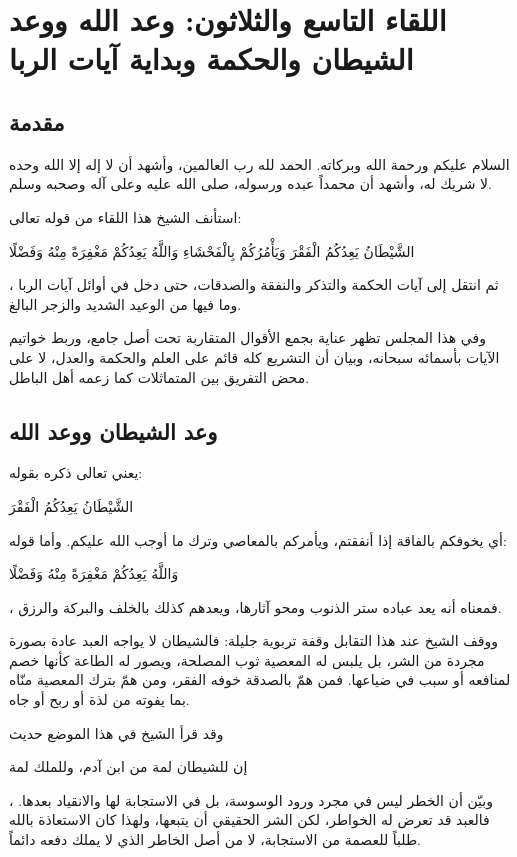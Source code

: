 \chapter{اللقاء التاسع والثلاثون: وعد الله ووعد الشيطان والحكمة وبداية آيات الربا}

\section{مقدمة}
السلام عليكم ورحمة الله وبركاته. الحمد لله رب العالمين، وأشهد أن لا إله إلا الله وحده لا شريك له، وأشهد أن محمداً عبده ورسوله، صلى الله عليه وعلى آله وصحبه وسلم.

استأنف الشيخ هذا اللقاء من قوله تعالى: \begin{ayah}الشَّيْطَانُ يَعِدُكُمُ الْفَقْرَ وَيَأْمُرُكُمْ بِالْفَحْشَاءِ وَاللَّهُ يَعِدُكُمْ مَغْفِرَةً مِنْهُ وَفَضْلًا\end{ayah}، ثم انتقل إلى آيات الحكمة والتذكر والنفقة والصدقات، حتى دخل في أوائل آيات الربا وما فيها من الوعيد الشديد والزجر البالغ.

وفي هذا المجلس تظهر عناية  بجمع الأقوال المتقاربة تحت أصل جامع، وربط خواتيم الآيات بأسمائه سبحانه، وبيان أن التشريع كله قائم على العلم والحكمة والعدل، لا على محض التفريق بين المتماثلات كما زعمه أهل الباطل.

\separator

\section{وعد الشيطان ووعد الله}
 يعني تعالى ذكره بقوله: \begin{ayah}الشَّيْطَانُ يَعِدُكُمُ الْفَقْرَ\end{ayah} أي يخوفكم بالفاقة إذا أنفقتم، ويأمركم بالمعاصي وترك ما أوجب الله عليكم. وأما قوله: \begin{ayah}وَاللَّهُ يَعِدُكُمْ مَغْفِرَةً مِنْهُ وَفَضْلًا\end{ayah}، فمعناه أنه يعد عباده ستر الذنوب ومحو آثارها، ويعدهم كذلك بالخلف والبركة والرزق.

ووقف الشيخ عند هذا التقابل وقفة تربوية جليلة: فالشيطان لا يواجه العبد عادة بصورة مجردة من الشر، بل يلبس له المعصية ثوب المصلحة، ويصور له الطاعة كأنها خصم لمنافعه أو سبب في ضياعها. فمن همّ بالصدقة خوفه الفقر، ومن همّ بترك المعصية منّاه بما يفوته من لذة أو ربح أو جاه.

وقد قرأ الشيخ في هذا الموضع حديث \begin{hadith}إن للشيطان لمة من ابن آدم، وللملك لمة\end{hadith}، وبيّن أن الخطر ليس في مجرد ورود الوسوسة، بل في الاستجابة لها والانقياد بعدها. فالعبد قد تعرض له الخواطر، لكن الشر الحقيقي أن يتبعها، ولهذا كان الاستعاذة بالله طلباً للعصمة من الاستجابة، لا من أصل الخاطر الذي لا يملك دفعه دائماً.

